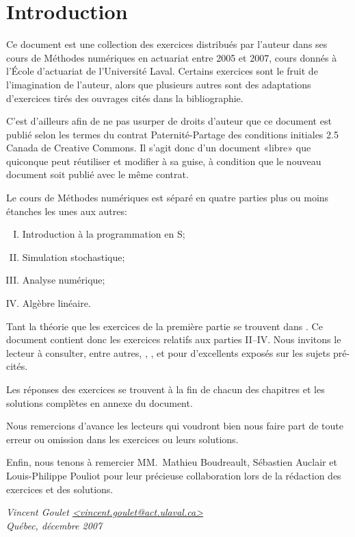\chapter*{Introduction}


Ce document est une collection des exercices distribués par l'auteur
dans ses cours de Méthodes numériques en actuariat entre 2005 et 2007,
cours donnés à l'École d'actuariat de l'Université Laval. Certains
exercices sont le fruit de l'imagination de l'auteur, alors que
plusieurs autres sont des adaptations d'exercices tirés des ouvrages
cités dans la bibliographie.

C'est d'ailleurs afin de ne pas usurper de droits d'auteur que ce
document est publié selon les termes du contrat Paternité-Partage des
conditions initiales 2.5 Canada de Creative Commons. Il s'agit donc
d'un document «libre» que quiconque peut réutiliser et modifier à sa
guise, à condition que le nouveau document soit publié avec le même
contrat.

Le cours de Méthodes numériques est séparé en quatre parties plus ou
moins étanches les unes aux autres:
\begin{enumerate}[I.]
\item Introduction à la programmation en S;
\item Simulation stochastique;
\item Analyse numérique;
\item Algèbre linéaire.
\end{enumerate}
Tant la théorie que les exercices de la première partie se trouvent
dans \cite{Goulet_intro_S}. Ce document contient donc les exercices
relatifs aux parties II--IV. Nous invitons le lecteur à consulter,
entre autres, \cite{Ripley_87}, \cite{Gentle_98}, \cite{BurdenFaires}
et \cite{Anton8e} pour d'excellents exposés sur les sujets pré-cités.

Les réponses des exercices se trouvent à la fin de chacun des
chapitres et les solutions complètes en annexe du document.

Nous remercions d'avance les lecteurs qui voudront bien nous faire
part de toute erreur ou omission dans les exercices ou leurs
solutions.

Enfin, nous tenons à remercier MM.~Mathieu Boudreault, Sébastien
Auclair et Louis-Philippe Pouliot pour leur précieuse collaboration
lors de la rédaction des exercices et des solutions.

\begin{flushright}
  \itshape
  Vincent Goulet \url{<vincent.goulet@act.ulaval.ca>} \\
  Québec, décembre 2007
\end{flushright}

